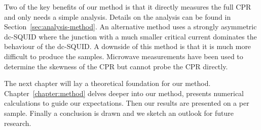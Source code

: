 Two of the key benefits of our method is that it directly measures the full CPR and only needs a simple analysis. Details on the analysis can be found in Section~\ref{sec:analysis-method}. An alternative method uses a strongly asymmetric dc-SQUID where the junction with a much smaller critical current dominates the behaviour of the dc-SQUID.\cite{muraniBallisticEdgeStates2017,dellaroccaMeasurementCurrentPhaseRelation2007} A downside of this method is that it is much more difficult to produce the samples. Microwave measurements have been used to determine the skewness of the CPR but cannot probe the CPR directly.\cite{schmidtProbingCurrentphaseRelation2020}


The next chapter will lay a theoretical foundation for our method. Chapter~\ref{chapter:method} delves deeper into our method, presents numerical calculations to guide our expectations. Then our results are presented on a per sample. Finally a conclusion is drawn and we sketch an outlook for future research.